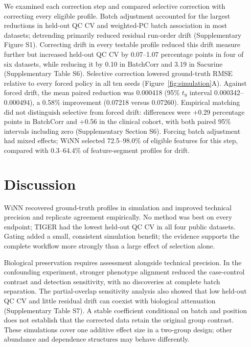 \documentclass[namedate,webpdf,modern,large,nocrop]{oup-authoring-template}
\begin{document}
We examined each correction step and compared selective correction with correcting every eligible profile. Batch adjustment accounted for the largest reductions in held-out QC CV and weighted-PC batch association in most datasets; detrending primarily reduced residual run-order drift (Supplementary Figure S1). Correcting drift in every testable profile reduced this drift measure further but increased held-out QC CV by 0.07--1.07 percentage points in four of six datasets, while reducing it by 0.10 in BatchCorr and 3.19 in Sacurine (Supplementary Table S6). Selective correction lowered ground-truth RMSE relative to every forced policy in all ten seeds (Figure~\ref{fig:simulation}A). Against forced drift, the mean paired reduction was 0.000418 (95\% $t_9$ interval 0.000342--0.000494), a 0.58\% improvement (0.07218 versus 0.07260). Empirical matching did not distinguish selective from forced drift: differences were +0.29 percentage points in BatchCorr and +0.56 in the clinical cohort, with both paired 95\% intervals including zero (Supplementary Section S6). Forcing batch adjustment had mixed effects; WiNN selected 72.5--98.0\% of eligible features for this step, compared with 0.3--64.4\% of feature-segment profiles for drift.

\section{Discussion}
\label{sec:discussion}

WiNN recovered ground-truth profiles in simulation and improved technical precision and replicate agreement empirically. No method was best on every endpoint; TIGER had the lowest held-out QC CV in all four public datasets. Gating added a small, consistent simulation benefit; the evidence supports the complete workflow more strongly than a large effect of selection alone.

Biological preservation requires assessment alongside technical precision. In the confounding experiment, stronger phenotype alignment reduced the case-control contrast and detection sensitivity, with no discoveries at complete batch separation. The partial-overlap sensitivity analysis also showed that low held-out QC CV and little residual drift can coexist with biological attenuation (Supplementary Table S7). A stable coefficient conditional on batch and position does not establish that the corrected data retain the original group contrast. These simulations cover one additive effect size in a two-group design; other abundance and dependence structures may behave differently.
\end{document}
